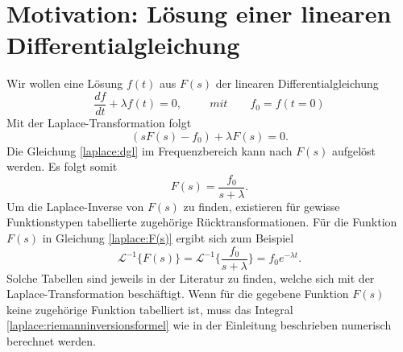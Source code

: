 %
%
%



\section{Motivation: Lösung einer linearen Differentialgleichung
\label{laplace:section:problemstellung}}
Wir wollen eine Lösung $f(t)$ aus $F(s)$ der linearen Differentialgleichung 
\begin{equation}
\frac{df}{dt} + \lambda f(t) = 0, \qquad ~~mit \qquad f_{0} = f(t=0)
\end{equation}
Mit der Laplace-Transformation folgt
\begin{equation}
(sF(s) - f_{0}) + \lambda F(s) = 0.
\label{laplace:dgl}
\end{equation}
Die Gleichung \eqref{laplace:dgl} im Frequenzbereich kann nach $F(s)$ aufgelöst werden.
Es folgt somit
\begin{equation}
F(s) = \frac{f_{0}}{s + \lambda}.
\label{laplace:F(s)}
\end{equation}
Um die Laplace-Inverse von $F(s)$ zu finden, existieren für gewisse Funktionstypen tabellierte zugehörige Rücktransformationen.
Für die Funktion $F(s)$ in Gleichung \eqref{laplace:F(s)} ergibt sich zum Beispiel
\begin{equation}
\mathcal{L}^{-1}\{F(s)\}=\mathcal{L}^{-1}\{\frac{f_{0}}{s+\lambda}\} = f_{0}e^{-\lambda t}.
\end{equation}
Solche Tabellen sind jeweils in der Literatur zu finden, welche sich mit der Laplace-Transformation beschäftigt.
Wenn für die gegebene Funktion $F(s)$ keine zugehörige Funktion tabelliert ist, muss das Integral \eqref{laplace:riemanninversionsformel} wie in der Einleitung beschrieben numerisch berechnet werden.

